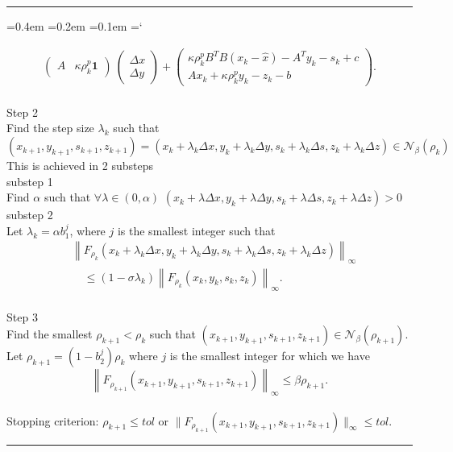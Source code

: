 \documentclass{report}
\theoremstyle{plain}
\theoremstyle{remark}
\newenvironment{algorithmJP} 
{\def\block{\phantom{a}\hspace{10pt}}\setlength{\parindent}{0pt} \par \vspace{\baselineskip}\hrule%
\smallskip \ttfamily %
\fontdimen2\font=0.4em%
\fontdimen3\font=0.2em%
\fontdimen7\font=0.1em%
\hyphenchar\font=`\-%
}
{\smallskip \hrule \vspace{\baselineskip}\par}
\newcommand\en{\mathcal{N}}
\newcommand\I{\mathbf{1}}
\begin{document}
\begin{algorithmJP}
\begin{equation*}
\begin{split}
\begin{pmatrix}
          A &  \kappa\rho_k^p\I
         \end{pmatrix}
         \ 
         \begin{pmatrix} 
          \Delta x\\
          \Delta y
         \end{pmatrix} 
          + 
          \begin{pmatrix} 
         \kappa\rho_k^p B^TB\left(x_k - \hat x\right) - A^Ty_k  - s_k + c \\
         Ax_k + \kappa \rho_k^p y_k - z_k -b 
         \end{pmatrix}.
         \end{split}
       \end{equation*}\\
Step 2\\
\block Find the step size $\lambda_k$ such that\\
\block $(x_{k+1},y_{k+1},s_{k+1},z_{k+1}) = (x_k + \lambda_k\Delta x,y_k + \lambda_k\Delta y,s_k + \lambda_k\Delta s,z_k + \lambda_k\Delta z) \in \en_\beta(\rho_k)$\\
\block This is achieved in 2 substeps\\
\block substep 1\\
\block Find $\alpha$ such that $\forall \lambda\in(0,\alpha)$ $(x_k + \lambda\Delta x,y_k + \lambda\Delta y,s_k + \lambda\Delta s,z_k + \lambda\Delta z) > 0$\\
\block substep 2\\
\block Let $\lambda_k = \alpha b_1^j$, where $j$ is the smallest integer such that
\block \begin{align*}
        &\left\|F_{\rho_k}\left(x_k + \lambda_k\Delta x,y_k + \lambda_k\Delta y,s_k + \lambda_k\Delta s,z_k + \lambda_k\Delta z\right)\right\|_\infty\\ 
         &\phantom{\|} \le \left(1- \sigma\lambda_k\right)\left\|F_{\rho_k}\left(x_k,y_k,s_k,z_k\right)\right\|_\infty.  
       \end{align*}\\
Step 3\\
\block Find the smallest $\rho_{k+1} < \rho_k$ such that $(x_{k+1},y_{k+1},s_{k+1},z_{k+1}) \in \en_\beta(\rho_{k+1})$.\\
\block Let $\rho_{k+1} = (1- b_2^j)\rho_k$ where $j$ is the smallest integer for which we have
\block \[
        \left\|F_{\rho_{k+1}}\left(x_{k+1},y_{k+1},s_{k+1},z_{k+1}\right)\right\|_\infty \le \beta \rho_{k+1}. 
       \]\\
Stopping criterion: $\rho_{k+1} \le tol$ or $\|F_{\rho_{k+1}}(x_{k+1},y_{k+1},s_{k+1},z_{k+1})\|_\infty \le tol$.
\end{algorithmJP}
\end{document}
